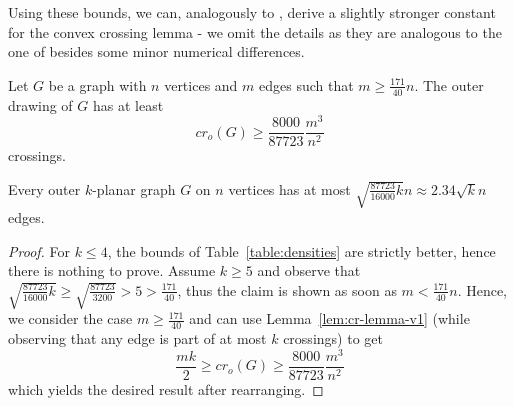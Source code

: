 \documentclass[nolineno,a4paper,USenglish,cleveref,autoref,thm-restate]
{socg}
\begin{document}
Using these bounds, we can, analogously to \cite{DBLP:conf/compgeom/AichholzerOOPSS22}, derive a slightly stronger constant for the convex crossing lemma - we omit the details as they are analogous to the one of \cite{DBLP:conf/compgeom/AichholzerOOPSS22} besides some minor numerical differences.
\begin{lemma}\label{lem:cr-lemma-v1}
Let $G$ be a graph with $n$ vertices and $m$ edges such that $m \geq \frac{171}{40}n$. The outer drawing of $G$ has at least
\[cr_o(G) \geq \frac{8000}{87723}\frac{m^3}{n^2}\]
crossings.
\end{lemma}
\begin{theorem}\label{thm:edge-density-second}
Every outer $k$-planar graph $G$ on $n$ vertices has at most $\sqrt{\frac{87723}
{16000}k}n \approx 2.34\sqrt{k}n$ edges.
\end{theorem}
\begin{proof}
For $k \leq 4$, the bounds of Table~\ref{table:densities} are strictly better, hence there is nothing to prove. Assume $k \geq 5$ and observe that $\sqrt{\frac{87723}
{16000}k} \geq \sqrt{\frac{87723}
{3200}} > 5 > \frac{171}{40}$, thus the claim is shown as soon as $m < \frac{171}{40}n$. Hence, we consider the case $m \geq \frac{171}{40}$ and can use Lemma~\ref{lem:cr-lemma-v1} (while observing that any edge is part of at most $k$ crossings) to get
\[\frac{mk}{2} \geq cr_o(G) \geq \frac{8000}{87723}\frac{m^3}{n^2}\]
which yields the desired result after rearranging.
\end{proof}
\end{document}
